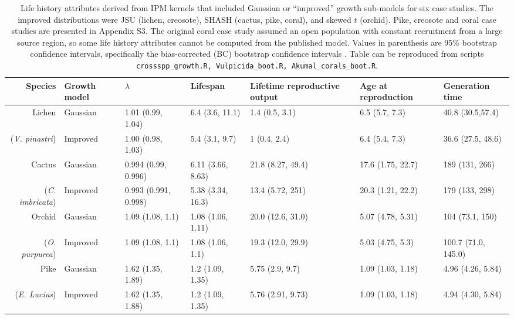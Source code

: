 \documentclass[12pt]{article}
\begin{document}
\begin{spacing}{1.9}
\begin{table}[tbp]
\renewcommand{\arraystretch}{1.5}
	\caption{Life history attributes derived from IPM kernels that included Gaussian or ``improved'' growth sub-models for six  case studies. The improved distributions were JSU (lichen, creosote), SHASH (cactus, pike, coral), and skewed $t$ (orchid). 
	Pike, creosote and coral case studies are presented in Appendix S3. The original coral case study assumed an open population with constant recruitment from a large source region, so some life history
	attributes cannot be computed from the published model. Values in parenthesis are 95\% bootstrap confidence intervals, specifically the bias-corrected (BC) bootstrap confidence intervals \cite{bca-1996}. Table can be reproduced from scripts \texttt{crossspp\_growth.R, Vulpicida\_boot.R, Akumal\_corals\_boot.R}.}
	\centering
	\begingroup\fontsize{10pt}{10pt}\selectfont
	\begin{tabular}{rp{1cm}|p{2.6cm}p{2.3cm}p{2.4cm}p{2.2cm}p{2.4cm}}
	{\textbf{Species}} & {\textbf{Growth model}} & {\textbf{$\lambda$}} & {\textbf{Lifespan}} & {\textbf{Lifetime reproductive output}} & {\textbf{Age at reproduction}} & {\textbf{Generation time}} \\ 
	\hline
		Lichen & Gaussian & 1.01 (0.99, 1.04) & 6.4 (3.6, 11.1) & 1.4 (0.5, 3.1) & 6.5 (5.7, 7.3) & 40.8 (30.5,57.4)\\ 
	(\textit{V. pinastri}) & Improved & 1.00 (0.98, 1.03) & 5.4 (3.1, 9.7) & 1 (0.4, 2.4) & 6.4 (5.4, 7.3) & 36.6 (27.5, 48.6)\\ 
	\hline
	Cactus & Gaussian & 0.994 (0.99, 0.996) & 6.11 (3.66, 8.63) & 21.8 (8.27, 49.4) & 17.6 (1.75, 22.7) & 189 (131, 266) \\ 
	(\textit{C. imbricata}) & Improved & 0.993 (0.991, 0.998) & 5.38 (3.34, 16.3) & 13.4 (5.72, 251) & 20.3 (1.21, 22.2) & 179 (133, 298) \\
	\hline
	Orchid & Gaussian & 1.09 (1.08, 1.1) & 1.08 (1.06, 1.11) & 20.0 (12.6, 31.0) & 5.07 (4.78, 5.31) & 104 (73.1, 150)\\ 
	(\textit{O. purpurea}) & Improved & 1.09 (1.08, 1.1) & 1.08 (1.06, 1.1) & 19.3 (12.0, 29.9) & 5.03 (4.75, 5.3) & 100.7 (71.0, 145.0) \\ 
	\hline
	Pike & Gaussian & 1.62 (1.35, 1.89) & 1.2 (1.09, 1.35) & 5.75 (2.9, 9.7) & 1.09 (1.03, 1.18) & 4.96 (4.26, 5.84) \\ 
	(\textit{E. Lucius}) & Improved & 1.62 (1.35, 1.88) & 1.2 (1.09, 1.35) & 5.76 (2.91, 9.73) & 1.09 (1.03, 1.18) & 4.94 (4.30, 5.84) \\ 

\end{tabular}
\end{table}
\end{spacing}
\end{document}
